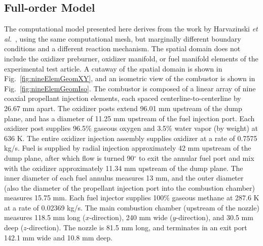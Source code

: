 \subsection{Full-order Model}
%
The computational model presented here derives from the work by Harvazinski \textit{et al.}~\cite{Harvazinski2019}, using the same computational mesh, but marginally different boundary conditions and a different reaction mechanism. The spatial domain does not include the oxidizer preburner, oxidizer manifold, or fuel manifold elements of the experimental test article. A cutaway of the spatial domain is shown in Fig.~\ref{fig:nineElemGeomXY}, and an isometric view of the combustor is shown in Fig.~\ref{fig:nineElemGeomIso}. The combustor is composed of a linear array of nine coaxial propellant injection elements, each spaced centerline-to-centerline by 26.67 mm apart. The oxidizer posts extend 96.01 mm upstream of the dump plane, and has a diameter of 11.25 mm upstream of the fuel injection port. Each oxidizer post supplies 96.5\% gaseous oxygen and 3.5\% water vapor (by weight) at 636 K. The entire oxidizer injection assembly supplies oxidizer at a rate of 0.7575 kg/s. Fuel is supplied by radial injection approximately 42 mm upstream of the dump plane, after which flow is turned 90$^{\circ}$ to exit the annular fuel port and mix with the oxidizer approximately 11.34 mm upstream of the dump plane. The inner diameter of each fuel annulus measures 13 mm, and the outer diameter (also the diameter of the propellant injection port into the combustion chamber) measures 15.75 mm. Each fuel injector supplies 100\% gaseous methane at 287.6 K at a rate of 0.02369 kg/s. The main combustion chamber (upstream of the nozzle) measures 118.5 mm long ($x$-direction), 240 mm wide ($y$-direction), and 30.5 mm deep ($z$-direction). The nozzle is 81.5 mm long, and terminates in an exit port 142.1 mm wide and 10.8 mm deep.



